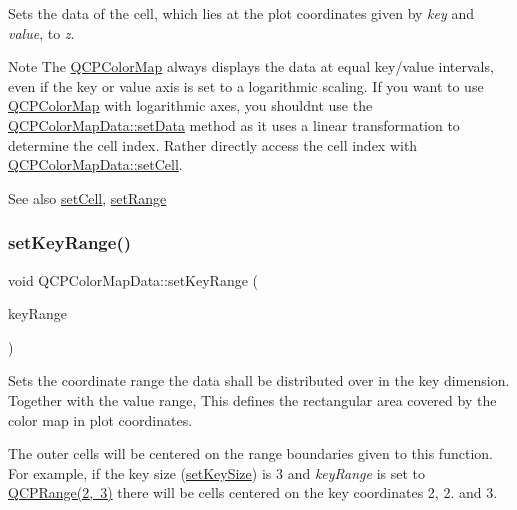 Sets the data of the cell, which lies at the plot coordinates given by {\itshape key} and {\itshape value}, to {\itshape z}.

\begin{DoxyNote}{Note}
The \mbox{\hyperlink{class_q_c_p_color_map}{Q\+C\+P\+Color\+Map}} always displays the data at equal key/value intervals, even if the key or value axis is set to a logarithmic scaling. If you want to use \mbox{\hyperlink{class_q_c_p_color_map}{Q\+C\+P\+Color\+Map}} with logarithmic axes, you shouldn\textquotesingle{}t use the \mbox{\hyperlink{class_q_c_p_color_map_data_afd2083ccfd6987ec94aa7ef8e91ca39a}{Q\+C\+P\+Color\+Map\+Data\+::set\+Data}} method as it uses a linear transformation to determine the cell index. Rather directly access the cell index with \mbox{\hyperlink{class_q_c_p_color_map_data_a8e75eaf8746596319032a93f3d2d0683}{Q\+C\+P\+Color\+Map\+Data\+::set\+Cell}}.
\end{DoxyNote}
\begin{DoxySeeAlso}{See also}
\mbox{\hyperlink{class_q_c_p_color_map_data_a8e75eaf8746596319032a93f3d2d0683}{set\+Cell}}, \mbox{\hyperlink{class_q_c_p_color_map_data_aad9c1c7c703c1339489fc730517c83d4}{set\+Range}} 
\end{DoxySeeAlso}
\mbox{\label{class_q_c_p_color_map_data_a0738c485f3c9df9ea1241b7a8bb6a86e}} 
\subsubsection{\texorpdfstring{set\+Key\+Range()}{setKeyRange()}}
{\footnotesize\ttfamily void Q\+C\+P\+Color\+Map\+Data\+::set\+Key\+Range (\begin{DoxyParamCaption}\item[{const \mbox{\hyperlink{class_q_c_p_range}{Q\+C\+P\+Range}} \&}]{key\+Range }\end{DoxyParamCaption})}

Sets the coordinate range the data shall be distributed over in the key dimension. Together with the value range, This defines the rectangular area covered by the color map in plot coordinates.

The outer cells will be centered on the range boundaries given to this function. For example, if the key size (\mbox{\hyperlink{class_q_c_p_color_map_data_ac7ef70e383aface34b44dbde49234b6b}{set\+Key\+Size}}) is 3 and {\itshape key\+Range} is set to {\ttfamily \mbox{\hyperlink{class_q_c_p_range}{Q\+C\+P\+Range(2, 3)}}} there will be cells centered on the key coordinates 2, 2. and 3.

